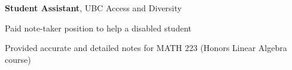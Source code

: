 \documentclass[margin,line]{res}
\newenvironment{list3}{
  \begin{list}{\textopenbullet}{
      \setlength{\itemsep}{0in}
      \setlength{\parsep}{0in} \setlength{\parskip}{0in}
      \setlength{\topsep}{0in} \setlength{\partopsep}{0in} 
      \setlength{\leftmargin}{0.1in}}}{\end{list}}
\begin{document}
\begin{resume}
{\bf Student Assistant}, UBC Access and Diversity\\
\vspace*{-.3cm}
\begin{list3}
\item Paid note-taker position to help a disabled student 
\item Provided accurate and detailed notes for MATH 223 (Honors Linear Algebra course)
\end{list3}

\vspace*{.5cm}

\noindent{}

\end{resume}
\end{document}
